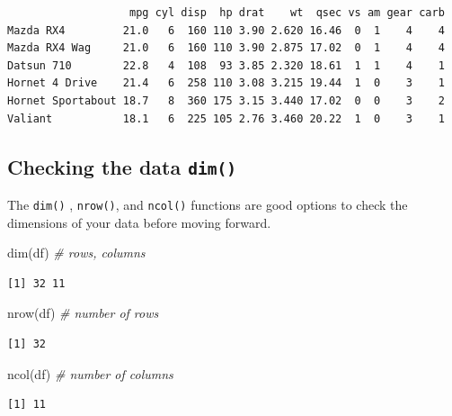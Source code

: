 \documentclass[
]{article}
\newenvironment{Shaded}{\begin{snugshade}}{\end{snugshade}}
\newcommand{\CommentTok}[1]{\textcolor[rgb]{0.56,0.35,0.01}{\textit{#1}}}
\newcommand{\FunctionTok}[1]{\textcolor[rgb]{0.00,0.00,0.00}{#1}}
\newcommand{\NormalTok}[1]{#1}
\begin{document}
\begin{verbatim}
                   mpg cyl disp  hp drat    wt  qsec vs am gear carb
Mazda RX4         21.0   6  160 110 3.90 2.620 16.46  0  1    4    4
Mazda RX4 Wag     21.0   6  160 110 3.90 2.875 17.02  0  1    4    4
Datsun 710        22.8   4  108  93 3.85 2.320 18.61  1  1    4    1
Hornet 4 Drive    21.4   6  258 110 3.08 3.215 19.44  1  0    3    1
Hornet Sportabout 18.7   8  360 175 3.15 3.440 17.02  0  0    3    2
Valiant           18.1   6  225 105 2.76 3.460 20.22  1  0    3    1
\end{verbatim}

\hypertarget{checking-the-data-dim}{%
\subsection{\texorpdfstring{Checking the data
\texttt{dim()}}{Checking the data dim()}}\label{checking-the-data-dim}}

The \texttt{dim()} , \texttt{nrow()}, and \texttt{ncol()} functions are
good options to check the dimensions of your data before moving forward.

\begin{Shaded}
\begin{Highlighting}[]
\FunctionTok{dim}\NormalTok{(df) }\CommentTok{\# rows, columns}
\end{Highlighting}
\end{Shaded}

\begin{verbatim}
[1] 32 11
\end{verbatim}

\begin{Shaded}
\begin{Highlighting}[]
\FunctionTok{nrow}\NormalTok{(df) }\CommentTok{\# number of rows}
\end{Highlighting}
\end{Shaded}

\begin{verbatim}
[1] 32
\end{verbatim}

\begin{Shaded}
\begin{Highlighting}[]
\FunctionTok{ncol}\NormalTok{(df) }\CommentTok{\# number of columns}
\end{Highlighting}
\end{Shaded}

\begin{verbatim}
[1] 11
\end{verbatim}
\end{document}
